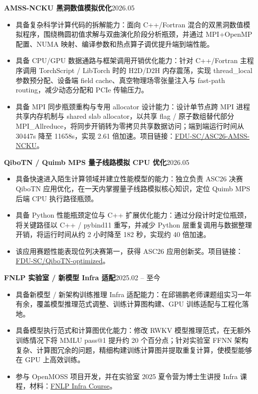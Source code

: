 \documentclass[10pt,a4paper]{ctexart}
\newcommand{\entry}[2]{\textbf{#1}\hfill {#2}}
\newcommand{\link}[2]{\href{#1}{#2}}
\begin{document}
\entry{AMSS-NCKU 黑洞数值模拟优化}{2026.05}
\begin{itemize}
  \item 具备复杂科学计算代码的拆解能力：面向 C++/Fortran 混合的双黑洞数值模拟程序，围绕椭圆初值求解与双曲演化阶段分析瓶颈，并通过 MPI+OpenMP 配置、NUMA 映射、编译参数和热点算子调优提升端到端性能。
  \item 具备 CPU/GPU 数据通路与框架调用开销优化能力：针对 C++/Fortran 主程序调用 TorchScript / LibTorch 时的 H2D/D2H 内存震荡，实现 thread\_local 参数预分配、设备端 field cache、真空物理场零张量注入与 fast-path routing，减少动态分配和 PCIe 传输压力。
  \item 具备 MPI 同步瓶颈重构与专用 allocator 设计能力：设计单节点跨 MPI 进程共享内存机制与 shared slab allocator，以共享 flag / 原子数组替代部分 MPI\_Allreduce，将同步开销转为零拷贝共享数据访问；端到端运行时间从 30447s 降至 11658s，实现 2.61 倍加速。项目链接：\link{https://github.com/FDU-SC/ASC26-AMSS-NCKU}{FDU-SC/ASC26-AMSS-NCKU}。
\end{itemize}

\entry{QiboTN / Quimb MPS 量子线路模拟 CPU 优化}{2026.05}
\begin{itemize}
  \item 具备快速进入陌生计算领域并建立性能模型的能力：独立负责 ASC26 决赛 QiboTN 应用优化，在一天内掌握量子线路模拟核心知识，定位 Quimb MPS 后端 CPU 执行路径瓶颈。
  \item 具备 Python 性能瓶颈定位与 C++ 扩展优化能力：通过分段计时定位瓶颈，将关键路径以 C++ / pybind11 重写，并减少 Python 层重复调用与数据整理开销，将运行时间从约 2 小时降至 182 秒，实现约 40 倍加速。
  \item 该应用赛题性能表现位列决赛第一，获得 ASC26 应用创新奖。项目链接：\link{https://github.com/FDU-SC/QiboTN-optimized}{FDU-SC/QiboTN-optimized}。
\end{itemize}

\entry{FNLP 实验室 / 新模型 Infra 适配}{2025.02 -- 至今}
\begin{itemize}
  \item 具备新模型 / 新架构训练推理 Infra 适配能力：在邱锡鹏老师课题组实习一年有余，覆盖模型推理范式调整、训练计算图构建、GPU 训练适配与工程化落地。
  \item 具备模型执行范式和计算图优化能力：修改 RWKV 模型推理范式，在无额外训练情况下将 MMLU pass@1 提升约 20 个百分点；针对实验室 FFNN 架构复杂、计算图冗余的问题，精细构建训练计算图并提取重复计算，使模型能够在 GPU 上高效训练。
  \item 参与 OpenMOSS 项目开发，并在实验室 2025 夏令营为博士生讲授 Infra 课程，材料：\link{https://fudan-nlp.feishu.cn/docx/GnOsdHiu1oouHixqfChcmVcMnBw?from=from_copylink}{FNLP Infra Course}。
\end{itemize}
\end{document}
